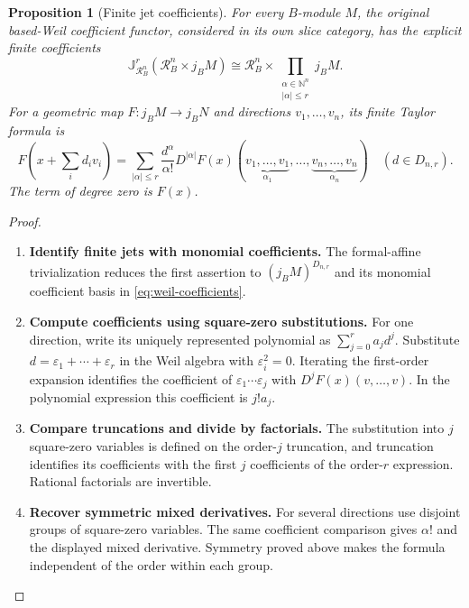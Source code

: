 \documentclass[11pt,a4paper]{article}
\numberwithin{algorithm}{section}
\numberwithin{equation}{section}
\newtheorem{proposition}[proposition]{Proposition}
\theoremstyle{definition}
\theoremstyle{remark}
\theoremstyle{plain}
\newcommand{\N}{\mathbb N}
\newcommand{\eps}{\varepsilon}
\newcommand{\Rline}{\mathcal R_B}
\theoremstyle{definition}
\theoremstyle{plain}
\begin{document}
\begin{proposition}[Finite jet coefficients]\label{prop:jet-coefficients}
For every $B$-module $M$, the original based-Weil
coefficient functor, considered in its own slice category,
has the explicit finite coefficients
\[
 \mathbb J_{\Rline^n}^r(\Rline^n\times j_BM)
 \cong
 \Rline^n\times
 \prod_{\substack{\alpha\in\N^n\\|\alpha|\le r}}j_BM.
\]
For a geometric map $F:j_BM\to j_BN$ and directions
$v_1,\ldots,v_n$, its finite Taylor formula is
\[
 F\left(x+\sum_i d_iv_i\right)
 =
 \sum_{|\alpha|\le r}
 \frac{d^\alpha}{\alpha!}
 D^{|\alpha|}F(x)
 (\underbrace{v_1,\ldots,v_1}_{\alpha_1},\ldots,
  \underbrace{v_n,\ldots,v_n}_{\alpha_n})
 \quad(d\in D_{n,r}).
\]
The term of degree zero is $F(x)$.
\end{proposition}
\begin{proof}\leavevmode
\begin{enumerate}[leftmargin=*,align=left]
\item \textbf{Identify finite jets with monomial coefficients.}
The formal-affine trivialization reduces the first assertion
to $(j_BM)^{D_{n,r}}$ and its monomial coefficient basis in
\eqref{eq:weil-coefficients}.

\item \textbf{Compute coefficients using square-zero substitutions.}
For one direction, write its uniquely represented polynomial
as $\sum_{j=0}^r a_jd^j$.
Substitute $d=\eps_1+\cdots+\eps_r$ in the Weil algebra
with $\eps_i^2=0$. Iterating the first-order expansion
identifies the coefficient of $\eps_1\cdots\eps_j$
with $D^jF(x)(v,\ldots,v)$.
In the polynomial expression this coefficient is $j!a_j$.

\item \textbf{Compare truncations and divide by factorials.}
The substitution into $j$ square-zero variables is defined
on the order-$j$ truncation, and truncation identifies its
coefficients with the first $j$ coefficients of the order-$r$
expression. Rational factorials are invertible.

\item \textbf{Recover symmetric mixed derivatives.}
For several directions use disjoint groups of square-zero
variables. The same coefficient comparison gives
$\alpha!$ and the displayed mixed derivative.
Symmetry proved above makes the formula independent of
the order within each group.
\end{enumerate}
\end{proof}
\end{document}
